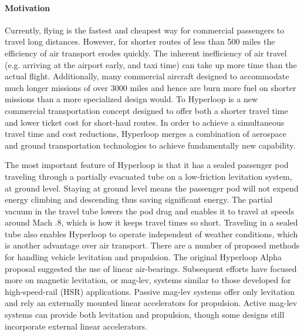 \paragraph{Motivation}

	Currently, flying is the fastest and cheapest way for commercial
	passengers to travel long distances. However, for shorter routes of less
	than 500 miles the efficiency of air transport erodes quickly. The
	inherent inefficiency of air travel (e.g. arriving at the airport early,
	and taxi time) can take up more time than the actual flight. Additionally,
	many commercial aircraft designed to accommodate much longer missions of
	over 3000 miles and hence are burn more fuel on shorter missions than a
	more specialized design would. To Hyperloop is a new commercial
	transportation concept designed to offer both a shorter travel time and
	lower ticket cost for short-haul routes. In order to achieve a
	simultaneous travel time and cost reductions, Hyperloop merges a
	combination of aerospace and ground transportation technologies to achieve
	fundamentally new capability.

	The most important feature of Hyperloop is that it has a sealed passenger
	pod traveling through a partially evacuated tube on a low-friction
	levitation system, at ground level. Staying at ground level means the
	passenger pod will not expend energy climbing and descending thus saving
	significant energy. The partial vacuum in the travel tube lowers the pod
	drag and enables it to travel at speeds around Mach .8, which is how it
	keeps travel times so short. Traveling in a sealed tube also enables
	Hyperloop to operate independent of weather conditions, which is another
	advantage over air transport. There are a number of proposed methods for
	handling vehicle levitation and propulsion. The original Hyperloop Alpha
	proposal suggested the use of linear air-bearings. Subsequent
	efforts have focused more on magnetic levitation, or mag-lev, systems
	similar to those developed for high-speed-rail (HSR) applications. Passive
	mag-lev systems offer only levitation and rely an externally mounted
	linear accelerators for propulsion. Active mag-lev systems can provide
	both levitation and propulsion, though some designs still incorporate
	external linear accelerators.

